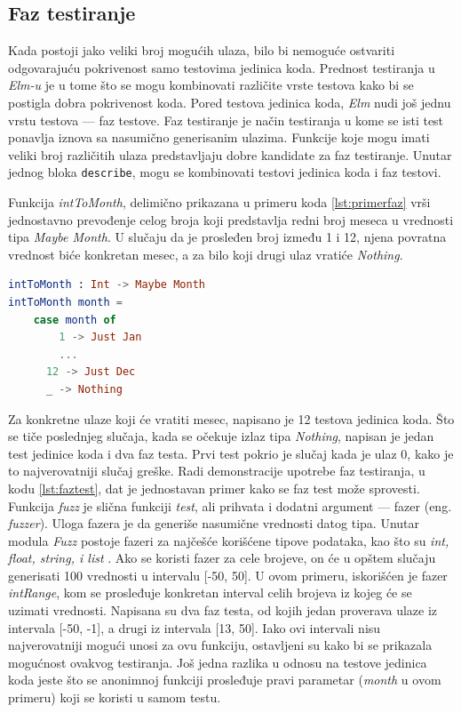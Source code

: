 \documentclass[12pt,oneside]{memoir}
\begin{document}
\subsection{Faz testiranje}
\par Kada postoji jako veliki broj mogućih ulaza, bilo bi nemoguće ostvariti odgovarajuću pokrivenost samo testovima jedinica koda. Prednost testiranja u \emph{Elm-u} je u tome što se mogu kombinovati različite vrste testova kako bi se postigla dobra pokrivenost koda. Pored testova jedinica koda, \emph{Elm} nudi još jednu vrstu testova --- faz testove. Faz testiranje je način testiranja u kome se isti test ponavlja iznova sa nasumično generisanim ulazima. Funkcije koje mogu imati veliki broj različitih ulaza predstavljaju dobre kandidate za faz testiranje. Unutar jednog bloka \texttt{describe}, mogu se kombinovati testovi jedinica koda i faz testovi.
\par Funkcija \emph{intToMonth}, delimično prikazana u primeru koda \ref{lst:primerfaz} vrši jednostavno prevođenje celog broja koji predstavlja redni broj meseca u vrednosti tipa \emph{Maybe Month}. U slučaju da je prosleđen broj između 1 i 12, njena povratna vrednost biće konkretan mesec, a za bilo koji drugi ulaz vratiće \emph{Nothing}.

\begin{minipage}{\linewidth}
\begin{lstlisting}[language=elm, basicstyle=\small, caption={Implementacija funkcije \emph{intToMonth}},captionpos=b, label={lst:primerfaz}]
intToMonth : Int -> Maybe Month
intToMonth month =
    case month of
     	1 -> Just Jan
        ...
      12 -> Just Dec
      _ -> Nothing
\end{lstlisting}
\end{minipage}

\par Za konkretne ulaze koji će vratiti mesec, napisano je 12 testova jedinica koda. Što se tiče poslednjeg slučaja, kada se očekuje izlaz tipa \emph{Nothing}, napisan je jedan test jedinice koda i dva faz testa. Prvi test pokrio je slučaj kada je ulaz 0, kako je to najverovatniji slučaj greške. Radi demonstracije upotrebe faz testiranja, u kodu \ref{lst:faztest}, dat je jednostavan primer kako se faz test može sprovesti. Funkcija \emph{fuzz} je slična funkciji \emph{test}, ali prihvata i dodatni argument --- fazer (eng. \emph{fuzzer}). Uloga fazera je da generiše nasumične vrednosti datog tipa. Unutar modula \emph{Fuzz} postoje fazeri za najčešće korišćene tipove podataka, kao što su \emph{int, float, string, i list} \cite{fuzz}. Ako se koristi fazer za cele brojeve, on će u opštem slučaju generisati 100 vrednosti u intervalu [-50, 50]. U ovom primeru, iskorišćen je fazer \emph{intRange}, kom se prosleđuje konkretan interval celih brojeva iz kojeg će se uzimati vrednosti. Napisana su dva faz testa, od kojih jedan proverava ulaze iz intervala [-50, -1], a drugi iz intervala [13, 50]. Iako ovi intervali nisu najverovatniji mogući unosi za ovu funkciju, ostavljeni su kako bi se prikazala mogućnost ovakvog testiranja. Još jedna razlika u odnosu na testove jedinica koda jeste što se anonimnoj funkciji prosleđuje pravi parametar (\emph{month} u ovom primeru) koji se koristi u samom testu. \\
\end{document}

